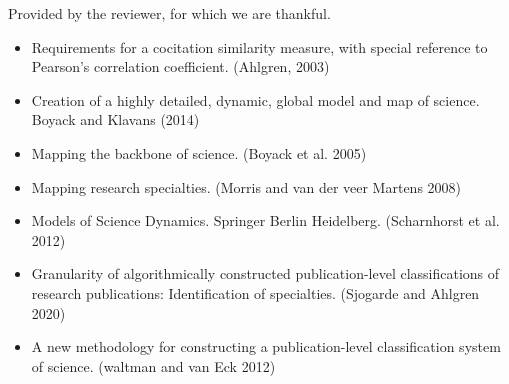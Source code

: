 \documentclass[11pt, oneside]{article}   	%
\begin{document}
\vspace{4 mm}

Provided by the reviewer, for which we are thankful. 
\begin{itemize}
\item Requirements for a cocitation similarity measure, with special reference to Pearson’s correlation coefficient. (Ahlgren, 2003)
\item Creation of a highly detailed, dynamic, global model and map of science. Boyack and Klavans (2014)
\item Mapping the backbone of science. (Boyack et al. 2005) 
\item Mapping research specialties. (Morris and van der veer Martens 2008)
\item Models of Science Dynamics. Springer Berlin Heidelberg. (Scharnhorst et al. 2012)
\item Granularity of algorithmically constructed publication-level classifications of research publications: Identification of specialties. (Sjogarde and Ahlgren 2020)
\item A new methodology for constructing a publication-level classification system of science. (waltman and van Eck 2012)
\end{itemize}
\end{document}
